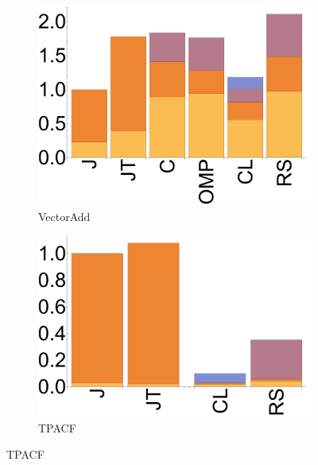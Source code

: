 \begin{figure}[ht]
  \begin{subfigure}[b]{0.5\textwidth}
      \centering
      \includegraphics[width=\textwidth]{data/bbattery_vectoradd_nexus5.pdf}
      \caption{VectorAdd}\label{fig:vectoradd}
  \end{subfigure}
  \begin{subfigure}[b]{0.5\textwidth}
      \centering
      \includegraphics[width=\textwidth]{data/bbattery_tpacf_nexus5.pdf}
      \caption{TPACF}
      \label{fig:TPACF}
  \end{subfigure}


\end{figure}
